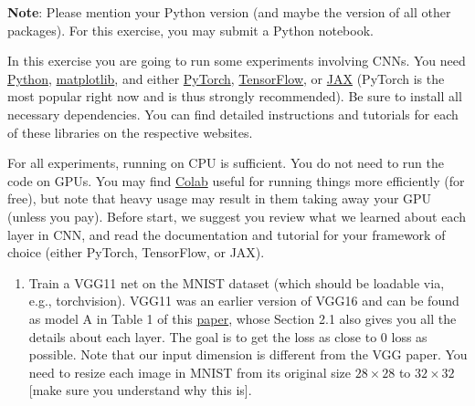 \documentclass[10pt,letter,notitlepage]{article}
\newcommand{\blue}[1]{{\color{blue}#1}}
\newcommand{\magenta}[1]{{\color{magenta}#1}}
\newcounter{exercise}
\begin{document}
\begin{exercise}
	\blue{\textbf{Note}: Please mention your Python version (and maybe the version of all other packages). For this exercise, you may submit a Python notebook.}
	
	
  In this exercise you are going to run some experiments involving CNNs. You need \href{https://www.python.org/}{\magenta{Python}}, \href{https://matplotlib.org/}{\magenta{matplotlib}}, and either \href{https://pytorch.org/get-started/locally/}{\magenta{PyTorch}},  \href{https://www.tensorflow.org/tutorials/quickstart/beginner}{\magenta{TensorFlow}}, or \href{https://jax.readthedocs.io/en/latest/notebooks/quickstart.html}{\magenta{JAX}} (PyTorch is the most popular right now and is thus strongly recommended). 
  Be sure to install all necessary dependencies. You can find detailed instructions and tutorials for each of these libraries on the respective websites. 
	
	For all experiments, running on CPU is sufficient. 
  You do not need to run the code on GPUs.
  You may find \href{https://colab.research.google.com/}{Colab} useful for running things more efficiently (for free), but note that heavy usage may result in them taking away your GPU (unless you pay).
  Before start, we suggest you review what we learned about each layer in CNN, and read the documentation and tutorial for your framework of choice (either PyTorch, TensorFlow, or JAX).
	
  \begin{enumerate}[label=\alph*)]
    \item Train a VGG11 net on the MNIST dataset (which should be loadable via, e.g., torchvision). 
		VGG11 was an earlier version of VGG16 and can be found as model A in Table 1 of this \href{https://arxiv.org/pdf/1409.1556.pdf}{\magenta{paper}}, whose Section 2.1 also gives you all the details about each layer.
		The goal is to get the loss as close to 0 loss as possible. Note that our input dimension is different from the VGG paper. You need to resize each image in MNIST from its original size $28 \times 28$ to $32 \times 32$ [make sure you understand why this is].
		

\end{enumerate}
\end{exercise}
\end{document}
